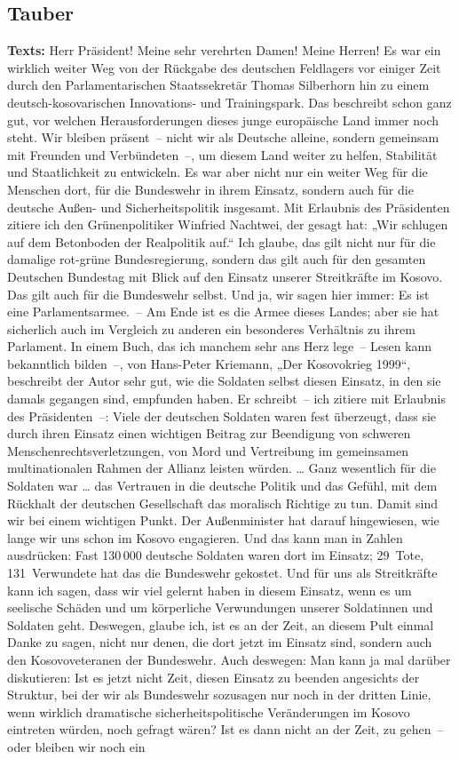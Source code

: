 \documentclass{article}
\begin{document}
\subsection{Tauber}
\noindent\textbf{Texts:} Herr Präsident! Meine sehr verehrten Damen! Meine Herren! Es war ein wirklich weiter Weg von der Rückgabe des deutschen Feldlagers vor einiger Zeit durch den Parlamentarischen Staatssekretär Thomas Silberhorn hin zu einem deutsch-kosovarischen Innovations- und Trainingspark. Das beschreibt schon ganz gut, vor welchen Herausforderungen dieses junge europäische Land immer noch steht. Wir bleiben präsent – nicht wir als Deutsche alleine, sondern gemeinsam mit Freunden und Verbündeten –, um diesem Land weiter zu helfen, Stabilität und Staatlichkeit zu entwickeln. Es war aber nicht nur ein weiter Weg für die Menschen dort, für die Bundeswehr in ihrem Einsatz, sondern auch für die deutsche Außen- und Sicherheitspolitik insgesamt. Mit Erlaubnis des Präsidenten zitiere ich den Grünenpolitiker Winfried Nachtwei, der gesagt hat: „Wir schlugen auf dem Betonboden der Realpolitik auf.“ Ich glaube, das gilt nicht nur für die damalige rot-grüne Bundesregierung, sondern das gilt auch für den gesamten Deutschen Bundestag mit Blick auf den Einsatz unserer Streitkräfte im Kosovo. Das gilt auch für die Bundeswehr selbst. Und ja, wir sagen hier immer: Es ist eine Parlamentsarmee. – Am Ende ist es die Armee dieses Landes; aber sie hat sicherlich auch im Vergleich zu anderen ein besonderes Verhältnis zu ihrem Parlament. In einem Buch, das ich manchem sehr ans Herz lege – Lesen kann bekanntlich bilden –, von Hans-Peter Kriemann, „Der Kosovokrieg 1999“, beschreibt der Autor sehr gut, wie die Soldaten selbst diesen Einsatz, in den sie damals gegangen sind, empfunden haben. Er schreibt – ich zitiere mit Erlaubnis des Präsidenten –: Viele der deutschen Soldaten waren fest überzeugt, dass sie durch ihren Einsatz einen wichtigen Beitrag zur Beendigung von schweren Menschenrechtsverletzungen, von Mord und Vertreibung im gemeinsamen multinationalen Rahmen der Allianz leisten würden. … Ganz wesentlich für die Soldaten war … das Vertrauen in die deutsche Politik und das Gefühl, mit dem Rückhalt der deutschen Gesellschaft das moralisch Richtige zu tun. Damit sind wir bei einem wichtigen Punkt. Der Außenminister hat darauf hingewiesen, wie lange wir uns schon im Kosovo engagieren. Und das kann man in Zahlen ausdrücken: Fast 130 000 deutsche Soldaten waren dort im Einsatz; 29 Tote, 131 Verwundete hat das die Bundeswehr gekostet. Und für uns als Streitkräfte kann ich sagen, dass wir viel gelernt haben in diesem Einsatz, wenn es um seelische Schäden und um körperliche Verwundungen unserer Soldatinnen und Soldaten geht. Deswegen, glaube ich, ist es an der Zeit, an diesem Pult einmal Danke zu sagen, nicht nur denen, die dort jetzt im Einsatz sind, sondern auch den Kosovoveteranen der Bundeswehr.  Auch deswegen: Man kann ja mal darüber diskutieren: Ist es jetzt nicht Zeit, diesen Einsatz zu beenden angesichts der Struktur, bei der wir als Bundeswehr sozusagen nur noch in der dritten Linie, wenn wirklich dramatische sicherheitspolitische Veränderungen im Kosovo eintreten würden, noch gefragt wären? Ist es dann nicht an der Zeit, zu gehen – oder bleiben wir noch ein 
\end{document}
